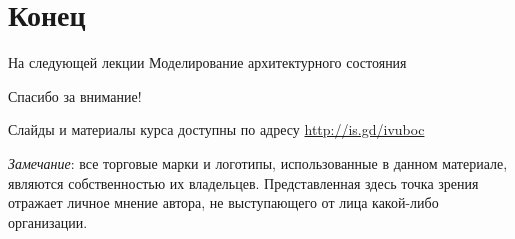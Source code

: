 \documentclass{beamer}
\begin{document}
\section*{Конец}

\begin{frame}{На следующей лекции}
Моделирование архитектурного состояния
\end{frame}


\begin{frame}

{\huge{Спасибо за внимание!}\par}

\vfill

Слайды и материалы курса доступны по адресу \url{http://is.gd/ivuboc} %

\vfill

\tiny{\textit{Замечание}: все торговые марки и логотипы, использованные в данном материале, являются собственностью их владельцев. Представленная здесь точка зрения отражает личное мнение автора, не выступающего от лица какой-либо организации.}

\end{frame}
\end{document}

